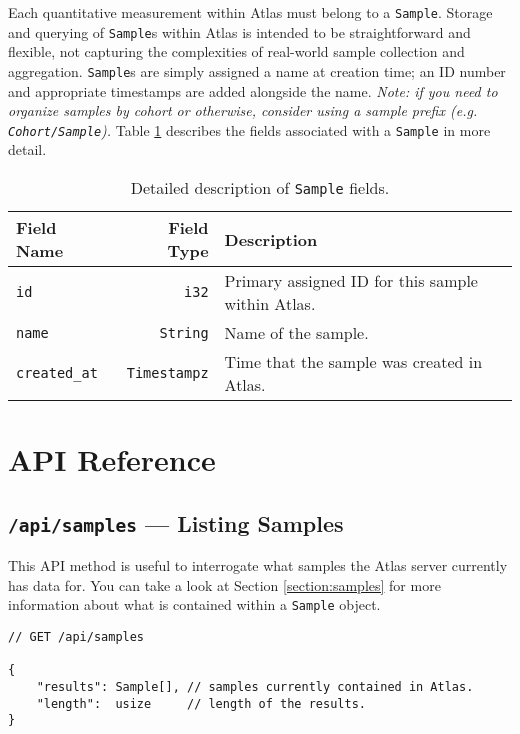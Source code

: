 \documentclass{article}
\newcommand{\Sample}{\texttt{Sample}}
\newcommand{\Samples}{\texttt{Sample}s}
\begin{document}
Each quantitative measurement within Atlas must belong to a \Sample. Storage and
querying of \Samples{ }within Atlas is intended to be straightforward and flexible, not
capturing the complexities of real-world sample collection and aggregation. \Samples{
}are simply assigned a name at creation time; an ID number and appropriate timestamps
are added alongside the name. \textit{Note: if you need to organize samples by cohort or
    otherwise, consider using a sample prefix (e.g. \texttt{Cohort/Sample}).} Table
\ref{table:sample-fields} describes the fields associated with a \Sample{ }in more
detail.

\begin{table}[ht]
    \centering
    \begin{tabular}{|l|r|l|}
        \hline
        \textbf{Field Name}  & \textbf{Field Type} & \textbf{Description}                              \\
        \hline
        \texttt{id}          & \texttt{i32}        & Primary assigned ID for this sample within Atlas. \\
        \texttt{name}        & \texttt{String}     & Name of the sample.                               \\
        \texttt{created\_at} & \texttt{Timestampz} & Time that the sample was created in Atlas.        \\
        \hline
    \end{tabular}
    \label{table:sample-fields}
    \caption{Detailed description of \Sample{ }fields.}
\end{table}

\section{API Reference}
\subsection{\texttt{/api/samples} — Listing Samples}

This API method is useful to interrogate what samples the Atlas server currently has
data for.  You can take a look at Section \ref{section:samples} for more information
about what is contained within a \texttt{Sample} object.

\vspace{1.5em}
\begin{lstlisting}[language=api]
// GET /api/samples

{
    "results": Sample[], // samples currently contained in Atlas.
    "length":  usize     // length of the results.
}
\end{lstlisting}
\end{document}

